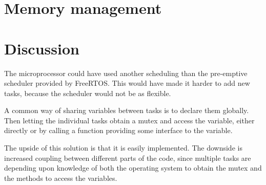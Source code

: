 \section{Memory management}\label{sec:memoryman}


%
%

\section{Discussion}
The microprocessor could have used another scheduling than the pre-emptive scheduler
 provided by FreeRTOS. This would have made it harder to add new tasks, because the scheduler would not be as flexible.

A common way of sharing variables between tasks is to declare them globally.
Then letting the individual tasks obtain a mutex and access the variable, either
directly or by calling a function providing some interface to the variable.

The upside of this solution is that it is easily implemented. The downside is
increased coupling between different parts of the code, since multiple tasks are
depending upon knowledge of both the operating system to obtain the mutex and
the methods to access the variables.


